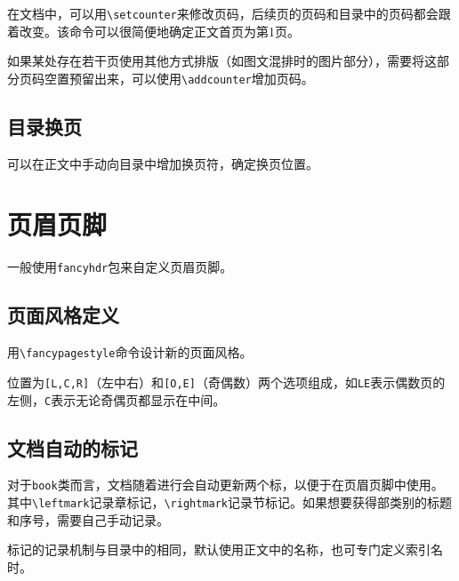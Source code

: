 \documentclass[10pt,openany]{book}
\begin{document}
在文档中，可以用\texttt{\textbackslash{}setcounter}来修改页码，后续页的页码和目录中的页码都会跟着改变。该命令可以很简便地确定正文首页为第1页。



如果某处存在若干页使用其他方式排版（如图文混排时的图片部分），需要将这部分页码空置预留出来，可以使用\texttt{\textbackslash{}addcounter}增加页码。



\section{目录换页}

可以在正文中手动向目录中增加换页符，确定换页位置。



\chapter{页眉页脚}

\label{hf}

一般使用\texttt{fancyhdr}包来自定义页眉页脚。

\section{页面风格定义}

用\texttt{\textbackslash{}fancypagestyle}命令设计新的页面风格。



位置为\texttt{[L,C,R]}（左中右）和\texttt{[O,E]}（奇偶数）两个选项组成，如\texttt{LE}表示偶数页的左侧，\texttt{C}表示无论奇偶页都显示在中间。

\section{文档自动的标记}

对于\texttt{book}类而言，文档随着进行会自动更新两个标，以便于在页眉页脚中使用。其中\texttt{\textbackslash{}leftmark}记录章标记，\texttt{\textbackslash{}rightmark}记录节标记。如果想要获得部类别的标题和序号，需要自己手动记录。

标记的记录机制与目录中的相同，默认使用正文中的名称，也可专门定义索引名时。


\end{document}
